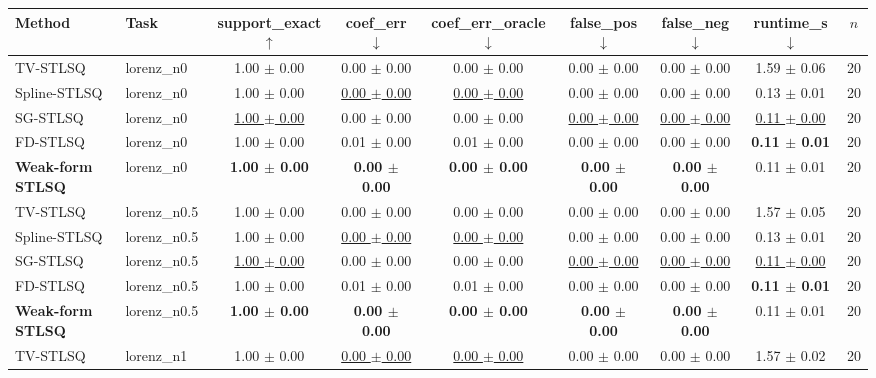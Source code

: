 \begin{tabular}{llccccccc}
\toprule
Method & Task & support\_exact $\uparrow$ & coef\_err $\downarrow$ & coef\_err\_oracle $\downarrow$ & false\_pos $\downarrow$ & false\_neg $\downarrow$ & runtime\_s $\downarrow$ & $n$ \\
\midrule
TV-STLSQ & lorenz\_n0 & 1.00 $\pm$ 0.00 & 0.00 $\pm$ 0.00 & 0.00 $\pm$ 0.00 & 0.00 $\pm$ 0.00 & 0.00 $\pm$ 0.00 & 1.59 $\pm$ 0.06 & 20 \\
Spline-STLSQ & lorenz\_n0 & 1.00 $\pm$ 0.00 & \underline{0.00 $\pm$ 0.00} & \underline{0.00 $\pm$ 0.00} & 0.00 $\pm$ 0.00 & 0.00 $\pm$ 0.00 & 0.13 $\pm$ 0.01 & 20 \\
SG-STLSQ & lorenz\_n0 & \underline{1.00 $\pm$ 0.00} & 0.00 $\pm$ 0.00 & 0.00 $\pm$ 0.00 & \underline{0.00 $\pm$ 0.00} & \underline{0.00 $\pm$ 0.00} & \underline{0.11 $\pm$ 0.00} & 20 \\
FD-STLSQ & lorenz\_n0 & 1.00 $\pm$ 0.00 & 0.01 $\pm$ 0.00 & 0.01 $\pm$ 0.00 & 0.00 $\pm$ 0.00 & 0.00 $\pm$ 0.00 & \textbf{0.11 $\pm$ 0.01} & 20 \\
\textbf{Weak-form STLSQ} & lorenz\_n0 & \textbf{1.00 $\pm$ 0.00} & \textbf{0.00 $\pm$ 0.00} & \textbf{0.00 $\pm$ 0.00} & \textbf{0.00 $\pm$ 0.00} & \textbf{0.00 $\pm$ 0.00} & 0.11 $\pm$ 0.01 & 20 \\
\midrule
TV-STLSQ & lorenz\_n0.5 & 1.00 $\pm$ 0.00 & 0.00 $\pm$ 0.00 & 0.00 $\pm$ 0.00 & 0.00 $\pm$ 0.00 & 0.00 $\pm$ 0.00 & 1.57 $\pm$ 0.05 & 20 \\
Spline-STLSQ & lorenz\_n0.5 & 1.00 $\pm$ 0.00 & \underline{0.00 $\pm$ 0.00} & \underline{0.00 $\pm$ 0.00} & 0.00 $\pm$ 0.00 & 0.00 $\pm$ 0.00 & 0.13 $\pm$ 0.01 & 20 \\
SG-STLSQ & lorenz\_n0.5 & \underline{1.00 $\pm$ 0.00} & 0.00 $\pm$ 0.00 & 0.00 $\pm$ 0.00 & \underline{0.00 $\pm$ 0.00} & \underline{0.00 $\pm$ 0.00} & \underline{0.11 $\pm$ 0.00} & 20 \\
FD-STLSQ & lorenz\_n0.5 & 1.00 $\pm$ 0.00 & 0.01 $\pm$ 0.00 & 0.01 $\pm$ 0.00 & 0.00 $\pm$ 0.00 & 0.00 $\pm$ 0.00 & \textbf{0.11 $\pm$ 0.01} & 20 \\
\textbf{Weak-form STLSQ} & lorenz\_n0.5 & \textbf{1.00 $\pm$ 0.00} & \textbf{0.00 $\pm$ 0.00} & \textbf{0.00 $\pm$ 0.00} & \textbf{0.00 $\pm$ 0.00} & \textbf{0.00 $\pm$ 0.00} & 0.11 $\pm$ 0.01 & 20 \\
\midrule
TV-STLSQ & lorenz\_n1 & 1.00 $\pm$ 0.00 & \underline{0.00 $\pm$ 0.00} & \underline{0.00 $\pm$ 0.00} & 0.00 $\pm$ 0.00 & 0.00 $\pm$ 0.00 & 1.57 $\pm$ 0.02 & 20 \\

\end{tabular}
